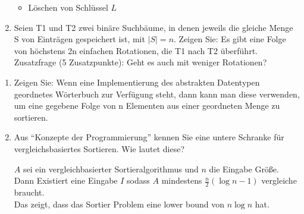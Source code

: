 \documentclass[a4paper]{assignment}
\begin{document}
\begin{problemlist}
\begin{enumerate}
\begin{answer}
\begin{itemize}
\item Löschen von Schlüssel $L$
\end{itemize}


\end{answer}	

			\item Seien T1 und T2 zwei binäre Suchbäume, in denen jeweils die gleiche Menge S von Einträgen gespeichert ist, mit $|S| = n$. Zeigen Sie: Es gibt eine Folge von höchstens 2n einfachen Rotationen, die T1 nach T2 überführt. \\
	Zusatzfrage (5 Zusatzpunkte): Geht es auch mit weniger Rotationen?


			\begin{answer}



			\end{answer}	
	\end{enumerate}
	

\begin{enumerate}

\item Zeigen Sie: Wenn eine Implementierung des abstrakten Datentypen geordnetes Wörterbuch zur Verfügung steht, dann kann man diese verwenden, um eine gegebene Folge von n Elementen aus einer geordneten Menge zu sortieren.

\begin{answer}

\end{answer}

\item Aus “Konzepte der Programmierung” kennen Sie eine untere Schranke für vergleichsbasiertes Sortieren. Wie lautet diese?

\begin{answer}
$A$ sei ein vergleichbasierter Sortieralgorithmus und $n$ die Eingabe Größe. Dann Existiert eine Eingabe $I$ sodass $A$ mindestens $\frac{n}{2} (\log n - 1)$ vergleiche braucht. \\
Das zeigt, dass das Sortier Problem eine lower bound von $n \log n$ hat.
\end{answer}


\end{enumerate}
\end{problemlist}
\end{document}
